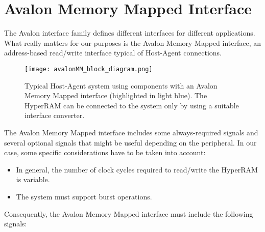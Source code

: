 \documentclass[10pt, english, a4paper, titlepage, oneside]{book}
\begin{document}
\section{Avalon Memory Mapped Interface}
\vspace{2mm}
The Avalon interface family defines different interfaces for different applications. What really matters for our purposes is the Avalon Memory Mapped interface, an address-based read/write interface typical of Host-Agent connections.
\vspace{6mm}
\begin{figure}[H]
    \centering
    \captionsetup{width=11.5cm}
    \texttt{[image: avalonMM\_block\_diagram.png]}
    \vspace{2mm}
    \caption{\centering Typical Host-Agent system using components with an Avalon Memory Mapped interface (highlighted in light blue). The HyperRAM can be connected to the system only by using a suitable interface converter.}
    \label{avalonMM_block_diagram}
\end{figure}
\vspace{4mm}
\noindent The Avalon Memory Mapped interface includes some always-required signals and several optional signals that might be useful depending on the peripheral. In our case, some specific considerations have to be taken into account:
\vspace{2mm}
\begin{itemize}
    \item In general, the number of clock cycles required to read/write the HyperRAM is variable.
    \vspace{0.5mm}
    \item The system must support burst operations.
\end{itemize} 
\vspace{4mm}
Consequently, the Avalon Memory Mapped interface must include the following signals:
\vspace{2mm}
\end{document}
